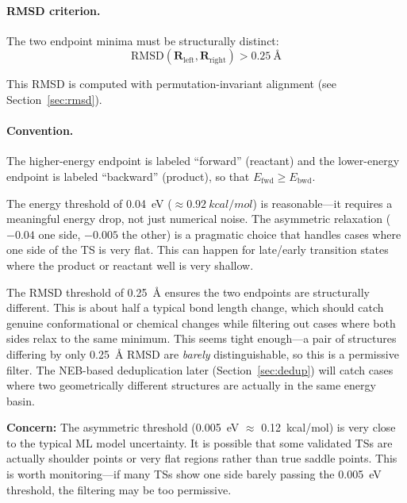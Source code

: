 \documentclass[11pt,a4paper]{article}
\begin{document}
\paragraph{RMSD criterion.} The two endpoint minima must be structurally distinct:
\begin{equation}
    \text{RMSD}(\mathbf{R}_\text{left}, \mathbf{R}_\text{right}) > \SI{0.25}{\angstrom}
\end{equation}

This RMSD is computed with permutation-invariant alignment (see Section~\ref{sec:rmsd}).

\paragraph{Convention.} The higher-energy endpoint is labeled ``forward'' (reactant) and the lower-energy endpoint is labeled ``backward'' (product), so that $E_\text{fwd} \geq E_\text{bwd}$.

\begin{evaluation}
The energy threshold of \SI{0.04}{eV} ($\approx \SI{0.92}{kcal/mol}$) is reasonable---it requires a meaningful energy drop, not just numerical noise. The asymmetric relaxation ($-0.04$ one side, $-0.005$ the other) is a pragmatic choice that handles cases where one side of the TS is very flat. This can happen for late/early transition states where the product or reactant well is very shallow.

The RMSD threshold of \SI{0.25}{\angstrom} ensures the two endpoints are structurally different. This is about half a typical bond length change, which should catch genuine conformational or chemical changes while filtering out cases where both sides relax to the same minimum. This seems tight enough---a pair of structures differing by only \SI{0.25}{\angstrom} RMSD are \emph{barely} distinguishable, so this is a permissive filter. The NEB-based deduplication later (Section~\ref{sec:dedup}) will catch cases where two geometrically different structures are actually in the same energy basin.

\textbf{Concern:} The asymmetric threshold (\SI{0.005}{eV} $\approx$ \SI{0.12}{kcal/mol}) is very close to the typical ML model uncertainty. It is possible that some validated TSs are actually shoulder points or very flat regions rather than true saddle points. This is worth monitoring---if many TSs show one side barely passing the \SI{0.005}{eV} threshold, the filtering may be too permissive.
\end{evaluation}
\end{document}

